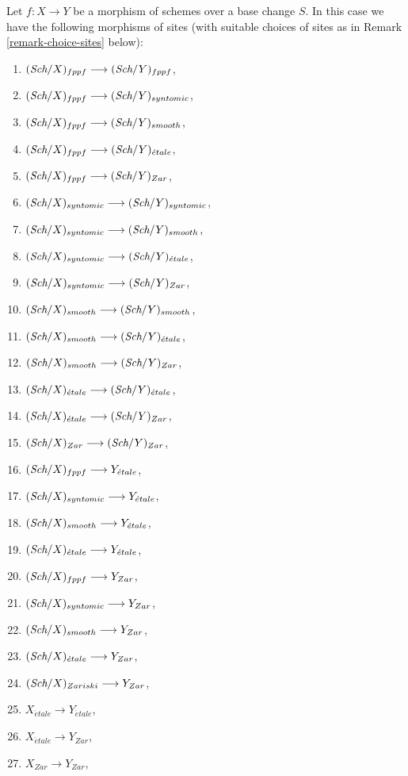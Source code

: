 \noindent
Let $f : X \to Y$ be a morphism of schemes over a base change $S$.
In this case we have the following morphisms of sites
(with suitable choices of sites as in Remark \ref{remark-choice-sites}
below):
\begin{enumerate}
\item $(\textit{Sch}/X)_{fppf} \longrightarrow (\textit{Sch}/Y)_{fppf}$,
\item $(\textit{Sch}/X)_{fppf} \longrightarrow (\textit{Sch}/Y)_{syntomic}$,
\item $(\textit{Sch}/X)_{fppf} \longrightarrow (\textit{Sch}/Y)_{smooth}$,
\item $(\textit{Sch}/X)_{fppf} \longrightarrow
(\textit{Sch}/Y)_{\acute{e}tale}$,
\item $(\textit{Sch}/X)_{fppf} \longrightarrow (\textit{Sch}/Y)_{Zar}$,
\item $(\textit{Sch}/X)_{syntomic} \longrightarrow (\textit{Sch}/Y)_{syntomic}$,
\item $(\textit{Sch}/X)_{syntomic} \longrightarrow (\textit{Sch}/Y)_{smooth}$,
\item $(\textit{Sch}/X)_{syntomic} \longrightarrow
(\textit{Sch}/Y)_{\acute{e}tale}$,
\item $(\textit{Sch}/X)_{syntomic} \longrightarrow (\textit{Sch}/Y)_{Zar}$,
\item $(\textit{Sch}/X)_{smooth} \longrightarrow (\textit{Sch}/Y)_{smooth}$,
\item $(\textit{Sch}/X)_{smooth} \longrightarrow
(\textit{Sch}/Y)_{\acute{e}tale}$,
\item $(\textit{Sch}/X)_{smooth} \longrightarrow (\textit{Sch}/Y)_{Zar}$,
\item $(\textit{Sch}/X)_{\acute{e}tale} \longrightarrow
(\textit{Sch}/Y)_{\acute{e}tale}$,
\item $(\textit{Sch}/X)_{\acute{e}tale} \longrightarrow (\textit{Sch}/Y)_{Zar}$,
\item $(\textit{Sch}/X)_{Zar} \longrightarrow (\textit{Sch}/Y)_{Zar}$,
\item $(\textit{Sch}/X)_{fppf} \longrightarrow Y_{\acute{e}tale}$,
\item $(\textit{Sch}/X)_{syntomic} \longrightarrow Y_{\acute{e}tale}$,
\item $(\textit{Sch}/X)_{smooth} \longrightarrow Y_{\acute{e}tale}$,
\item $(\textit{Sch}/X)_{\acute{e}tale} \longrightarrow Y_{\acute{e}tale}$,
\item $(\textit{Sch}/X)_{fppf} \longrightarrow Y_{Zar}$,
\item $(\textit{Sch}/X)_{syntomic} \longrightarrow Y_{Zar}$,
\item $(\textit{Sch}/X)_{smooth} \longrightarrow Y_{Zar}$,
\item $(\textit{Sch}/X)_{\acute{e}tale} \longrightarrow Y_{Zar}$,
\item $(\textit{Sch}/X)_{Zariski} \longrightarrow Y_{Zar}$,
\item $X_{\acute{e}tale} \longrightarrow Y_{\acute{e}tale}$,
\item $X_{\acute{e}tale} \longrightarrow Y_{Zar}$,
\item $X_{Zar} \longrightarrow Y_{Zar}$,
\end{enumerate}

